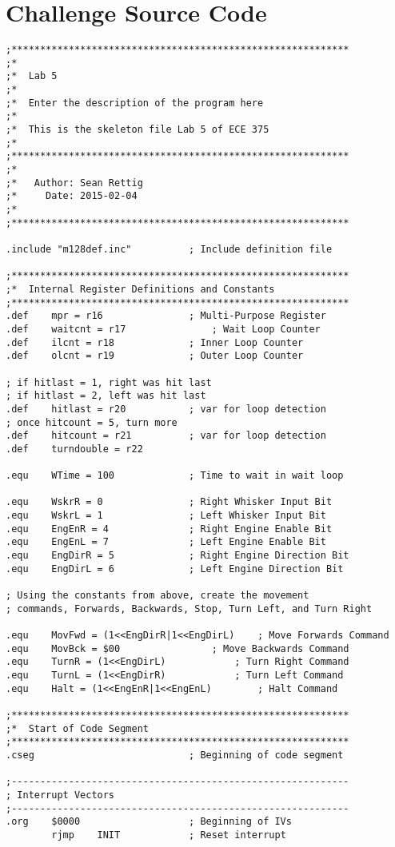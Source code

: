 \documentclass[12pt,letterpaper]{article}
\begin{document}
\section{Challenge Source Code}

\begin{verbatim}
;***********************************************************
;*
;*	Lab 5
;*
;*	Enter the description of the program here
;*
;*	This is the skeleton file Lab 5 of ECE 375
;*
;***********************************************************
;*
;*	 Author: Sean Rettig
;*	   Date: 2015-02-04
;*
;***********************************************************

.include "m128def.inc"			; Include definition file

;***********************************************************
;*	Internal Register Definitions and Constants
;***********************************************************
.def	mpr = r16				; Multi-Purpose Register
.def	waitcnt = r17				; Wait Loop Counter
.def	ilcnt = r18				; Inner Loop Counter
.def	olcnt = r19				; Outer Loop Counter

; if hitlast = 1, right was hit last
; if hitlast = 2, left was hit last
.def    hitlast = r20           ; var for loop detection
; once hitcount = 5, turn more
.def    hitcount = r21          ; var for loop detection
.def	turndouble = r22

.equ	WTime = 100				; Time to wait in wait loop

.equ	WskrR = 0				; Right Whisker Input Bit
.equ	WskrL = 1				; Left Whisker Input Bit
.equ	EngEnR = 4				; Right Engine Enable Bit
.equ	EngEnL = 7				; Left Engine Enable Bit
.equ	EngDirR = 5				; Right Engine Direction Bit
.equ	EngDirL = 6				; Left Engine Direction Bit

; Using the constants from above, create the movement 
; commands, Forwards, Backwards, Stop, Turn Left, and Turn Right

.equ	MovFwd = (1<<EngDirR|1<<EngDirL)	; Move Forwards Command
.equ	MovBck = $00				; Move Backwards Command
.equ	TurnR = (1<<EngDirL)			; Turn Right Command
.equ	TurnL = (1<<EngDirR)			; Turn Left Command
.equ	Halt = (1<<EngEnR|1<<EngEnL)		; Halt Command

;***********************************************************
;*	Start of Code Segment
;***********************************************************
.cseg							; Beginning of code segment

;-----------------------------------------------------------
; Interrupt Vectors
;-----------------------------------------------------------
.org	$0000					; Beginning of IVs
		rjmp 	INIT			; Reset interrupt


\end{verbatim}
\end{document}
